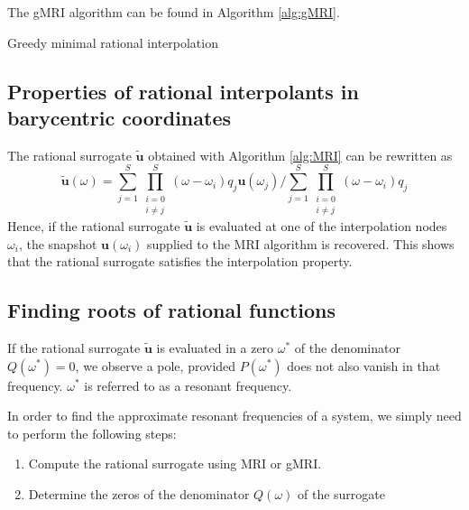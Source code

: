 \documentclass[11pt, a4paper]{article}
\begin{document}
The \acrshort{gMRI} algorithm can be found in Algorithm \ref{alg:gMRI}.

\begin{algorithm}
    \caption{Greedy minimal rational interpolation} \label{alg:gMRI}
    
\end{algorithm}

\subsection{Properties of rational interpolants in barycentric coordinates}
\label{subsec:properties}

The rational surrogate $\mathbf{\tilde{u}}$ obtained with Algorithm \ref{alg:MRI}
can be rewritten as
\begin{equation}
    \mathbf{\tilde{u}}(\omega)
    = \sum_{j=1}^S \prod_{\substack{i=0 \\ i \neq j}}^S (\omega - \omega_i) q_j \mathbf{u}(\omega_j)
    / \sum_{j=1}^S \prod_{\substack{i=0 \\ i \neq j}}^S (\omega - \omega_i) q_j
\end{equation}
Hence, if the rational surrogate $\mathbf{\tilde{u}}$ is evaluated at one of the
interpolation nodes $\omega_i$, the snapshot $\mathbf{u}(\omega_i)$ supplied to 
the \acrshort{MRI} algorithm is recovered. This shows that the rational surrogate
satisfies the interpolation property.

\subsection{Finding roots of rational functions}
\label{subsec:roots}

If the rational surrogate $\mathbf{\tilde{u}}$ is evaluated in a zero
$\omega^\ast$ of the denominator $Q(\omega^\ast) = 0$, we observe a pole,
provided $P(\omega^\ast)$ does not also vanish in that frequency.
$\omega^\ast$ is referred to as a resonant frequency.

In order to find the approximate resonant frequencies of a system,
we simply need to perform the following steps:

\begin{enumerate}
    \item Compute the rational surrogate using \acrshort{MRI} or \acrshort{gMRI}.
    \item Determine the zeros of the denominator $Q(\omega)$ of the surrogate
\end{enumerate}
\end{document}
